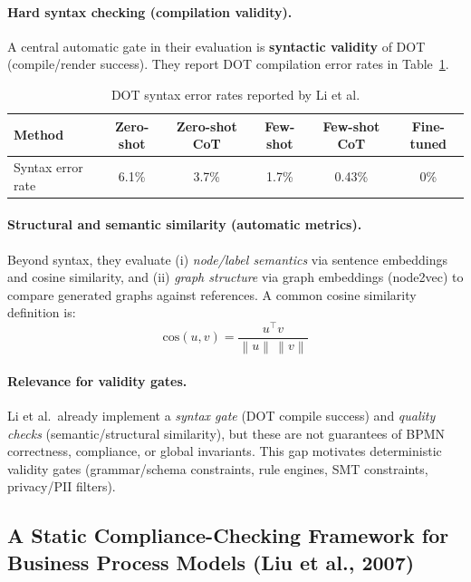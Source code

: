\paragraph{Hard syntax checking (compilation validity).}
A central automatic gate in their evaluation is \textbf{syntactic validity} of DOT (compile/render success).
They report DOT compilation error rates in Table~\ref{tab:li2025-syntax}. \cite{li-etal-2025-llm-based-business}

\begin{table}[t]
\centering
\small
\setlength{\tabcolsep}{6pt}
\renewcommand{\arraystretch}{1.15}
\begin{tabular}{@{}lccccc@{}}
\toprule
\textbf{Method} & Zero-shot & Zero-shot CoT & Few-shot & Few-shot CoT & Fine-tuned \\
\midrule
Syntax error rate & 6.1\% & 3.7\% & 1.7\% & 0.43\% & 0\% \\
\bottomrule
\end{tabular}
\caption{DOT syntax error rates reported by Li et al.}
\label{tab:li2025-syntax}
\end{table}

\paragraph{Structural and semantic similarity (automatic metrics).}
Beyond syntax, they evaluate (i) \emph{node/label semantics} via sentence embeddings and cosine similarity,
and (ii) \emph{graph structure} via graph embeddings (node2vec) to compare generated graphs against references. \cite{li-etal-2025-llm-based-business}
A common cosine similarity definition is:
\begin{equation}
\mathrm{cos}(u,v)=\frac{u^\top v}{\left\|u\right\|\,\left\|v\right\|}
\end{equation}

\paragraph{Relevance for validity gates.}
Li et al.\ already implement a \emph{syntax gate} (DOT compile success) and \emph{quality checks} (semantic/structural similarity),
but these are not guarantees of BPMN correctness, compliance, or global invariants. This gap motivates deterministic
validity gates (grammar/schema constraints, rule engines, SMT constraints, privacy/PII filters).

\subsection{A Static Compliance-Checking Framework for Business Process Models (Liu et al., 2007)}
\label{subsec:lmx07-static-compliance}

